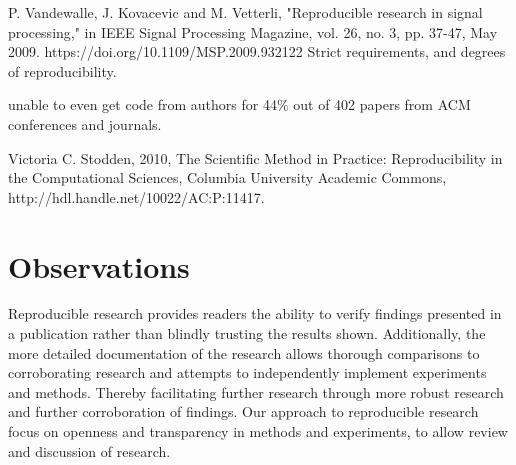 P. Vandewalle, J. Kovacevic and M. Vetterli, "Reproducible research in signal processing," in IEEE Signal Processing Magazine, vol. 26, no. 3, pp. 37-47, May 2009. https://doi.org/10.1109/MSP.2009.932122
Strict requirements, and degrees of reproducibility.


\cite{Collberg2016} unable to even get code from authors for 44\% out of 402 papers from ACM conferences and journals.

Victoria C. Stodden, 2010, The Scientific Method in Practice: Reproducibility in the Computational Sciences, Columbia University Academic Commons, http://hdl.handle.net/10022/AC:P:11417.


\section{Observations}
Reproducible research provides readers the ability to verify findings presented in a publication rather than blindly trusting the results shown. Additionally, the more detailed documentation of the research allows thorough comparisons to corroborating research and attempts to independently implement experiments and methods. Thereby facilitating further research through more robust research and further corroboration of findings. Our approach to reproducible research focus on openness and transparency in methods and experiments, to allow review and discussion of research.
